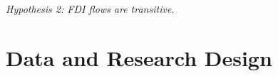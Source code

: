 \documentclass[reqno,onecolumn,letterpaper,12pt]{article}
\begin{document}

\begin{center}
\textit{Hypothesis 2: FDI flows are transitive.}
\end{center}




\section{Data and Research Design}

\end{document}
